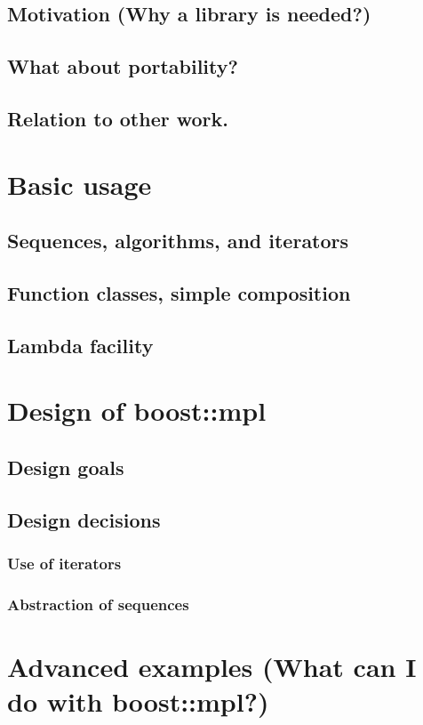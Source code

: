 \documentclass{netobjectdays}
\begin{document}
\subsection{Motivation (Why a library is needed?)}
\subsection{What about portability? }
\subsection{Relation to other work.}

\section{Basic usage}
\subsection{Sequences, algorithms, and iterators}
\subsection{Function classes, simple composition}
\subsection{Lambda facility}

\section{Design of boost::mpl}
\subsection{Design goals}
\subsection{Design decisions}
\subsubsection{Use of iterators}
\subsubsection{Abstraction of sequences}

\section{Advanced examples (What can I do with boost::mpl?)}
\end{document}
